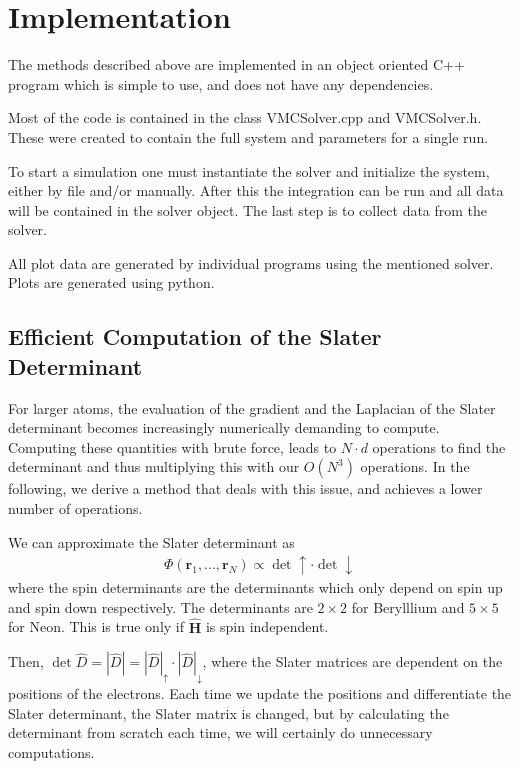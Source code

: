 \documentclass[twocolumns, a4paper,11pt,fleqn]{extarticle}
\newcommand{\eq}[1]{{\small\begin{align*}#1\end{align*}}}
\renewcommand\vec[1]{\boldsymbol{\mathbf{#1}}}
\newcommand{\OP}[1]{\mathbf{\widehat{#1}}}
\newcommand{\op}[1]{\hat{#1}}
\begin{document}
\clearpage




\section{Implementation}
The methods described above are implemented in an object oriented C++ program
which is simple to use, and does not have any dependencies. 

Most of the code is contained in the class VMCSolver.cpp and VMCSolver.h. 
These were created to contain the full system and parameters for a single run. 

To start a simulation one must instantiate the solver and 
initialize the system, either by file and/or manually. After this
the integration can be run and all data will be contained in the solver object.
The last step is to collect data from the solver. 

All plot data are generated by individual programs using the mentioned solver. 
Plots are generated using python. 

\subsection{Efficient Computation of the Slater Determinant}

For larger atoms, the evaluation of the gradient and the Laplacian of the Slater
determinant becomes increasingly numerically demanding
to compute. Computing these quantities with brute force, 
leads to $N\cdot d$ operations to find the determinant and thus
multiplying this with our $O(N^3)$ operations.
In the following, we derive a method that deals with this issue, 
and achieves a lower number of operations.

We can approximate the Slater determinant as
\eq{
	\Phi(\vec r_1, ..., \vec r_N) \propto \det\uparrow\cdot\det\downarrow
}
where the spin determinants are the determinants which only depend on spin up and spin down
respectively. The determinants are $2\times 2$ for Berylllium and $5\times 5$ for Neon.
This is true only if $\OP H$ is spin independent.

Then, $\det \op D = |\op D| = |\op D|_{\uparrow}\cdot |\op D|_{\downarrow}$, 
where the Slater matrices are dependent on the positions of the electrons. 
Each time we update the positions and differentiate the Slater determinant,
the Slater matrix is changed, but by calculating the determinant 
from scratch each time, we will certainly do unnecessary computations. 
\end{document}
